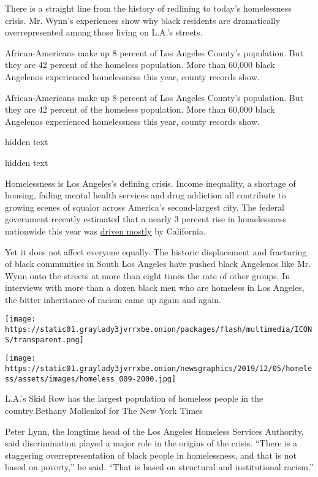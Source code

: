  There is a straight line from the history of redlining to today's
homelessness crisis. Mr. Wynn's experiences show why black residents are
dramatically overrepresented among those living on L.A.'s streets.

 African-Americans make up 8 percent of Los Angeles County's population.
But they are 42 percent of the homeless population. More than 60,000
black Angelenos experienced homelessness this year, county records show.

 African-Americans make up 8 percent of Los Angeles County's population.
But they are 42 percent of the homeless population. More than 60,000
black Angelenos experienced homelessness this year, county records show.

 hidden text

 hidden text

Homelessness is Los Angeles's defining crisis. Income inequality, a
shortage of housing, failing mental health services and drug addiction
all contribute to growing scenes of squalor across America's
second-largest city. The federal government recently estimated that a
nearly 3 percent rise in homelessness nationwide this year was
\href{https://www.nytimes3xbfgragh.onion/2019/12/20/us/politics/homelessness-trump-california.html}{driven
mostly} by California.

Yet it does not affect everyone equally. The historic displacement and
fracturing of black communities in South Los Angeles have pushed black
Angelenos like Mr. Wynn onto the streets at more than eight times the
rate of other groups. In interviews with more than a dozen black men who
are homeless in Los Angeles, the bitter inheritance of racism came up
again and again.

\texttt{[image: https://static01.graylady3jvrrxbe.onion/packages/flash/multimedia/ICONS/transparent.png]}

\texttt{[image: https://static01.graylady3jvrrxbe.onion/newsgraphics/2019/12/05/homeless/assets/images/homeless\_009-2000.jpg]}

L.A.'s Skid Row has the largest population of homeless people in the
country.Bethany Mollenkof for The New York Times

Peter Lynn, the longtime head of the Los Angeles Homeless Services
Authority, said discrimination played a major role in the origins of the
crisis. ``There is a staggering overrepresentation of black people in
homelessness, and that is not based on poverty,'' he said. ``That is
based on structural and institutional racism.''

